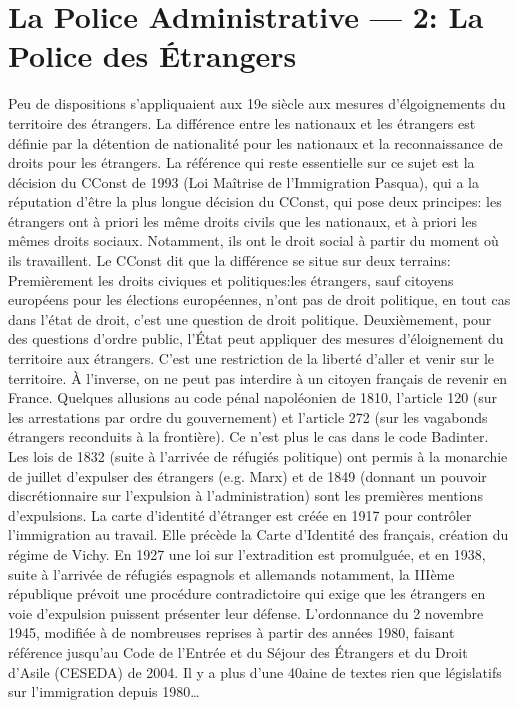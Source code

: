 \documentclass[math]{cours}
\begin{document}
\section{La Police Administrative --- 2: La Police des Étrangers}
Peu de dispositions s'appliquaient aux 19e siècle aux mesures d'élgoignements du territoire des étrangers.
La différence entre les nationaux et les étrangers est définie par la détention de nationalité pour les nationaux et la reconnaissance de droits pour les étrangers.
La référence qui reste essentielle sur ce sujet est la décision du CConst de 1993 (Loi Maîtrise de l'Immigration Pasqua), qui a la réputation d'être la plus longue décision du CConst, qui pose deux principes: les étrangers ont à priori les même droits civils que les nationaux, et à priori les mêmes droits sociaux.
Notamment, ils ont le droit social à partir du moment où ils travaillent.
Le CConst dit que la différence se situe sur deux terrains:
Premièrement les droits civiques et politiques:les étrangers, sauf citoyens européens pour les élections européennes, n'ont pas de droit politique, en tout cas dans l'état de droit, c'est une question de droit politique.
Deuxièmement, pour des questions d'ordre public, l'État peut appliquer des mesures d'éloignement du territoire aux étrangers.
C'est une restriction de la liberté d'aller et venir sur le territoire.
À l'inverse, on ne peut pas interdire à un citoyen français de revenir en France.
Quelques allusions au code pénal napoléonien de 1810, l'article 120 (sur les arrestations par ordre du gouvernement) et l'article 272 (sur les vagabonds étrangers reconduits à la frontière). Ce n'est plus le cas dans le code Badinter.
Les lois de 1832 (suite à l'arrivée de réfugiés politique) ont permis à la monarchie de juillet d'expulser des étrangers (e.g. Marx) et de 1849 (donnant un pouvoir discrétionnaire sur l'expulsion à l'administration) sont les premières mentions d'expulsions.
La carte d'identité d'étranger est créée en 1917 pour contrôler l'immigration au travail. Elle précède la Carte d'Identité des français, création du régime de Vichy.
En 1927 une loi sur l'extradition est promulguée, et en 1938, suite à l'arrivée de réfugiés espagnols et allemands notamment, la IIIème république prévoit une procédure contradictoire qui exige que les étrangers en voie d'expulsion puissent présenter leur défense.
L'ordonnance du 2 novembre 1945, modifiée à de nombreuses reprises à partir des années 1980, faisant référence jusqu'au Code de l'Entrée et du Séjour des Étrangers et du Droit d'Asile (CESEDA) de 2004.
Il y a plus d'une 40aine de textes rien que législatifs sur l'immigration depuis 1980\ldots
\end{document}

